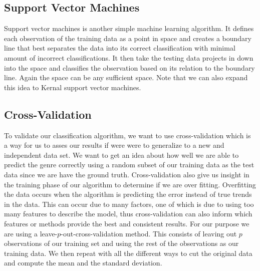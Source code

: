 \documentclass[12pt]{article}
\begin{document}
\subsection{Support Vector Machines} 
Support vector machines is another simple machine learning algorithm. It defines each observation of the training data as a point in space and creates a boundary line that best separates the data into its correct classification with minimal amount of incorrect classifications. It then take the testing data projects in down into the space and classifies the observation based on its relation to the boundary line. Again the space can be any sufficient space. Note that we can also expand this idea to Kernal support vector machines. 

\subsection{Cross-Validation}


To validate our classification algorithm, we want to use cross-validation which is a way for us to asses our results if were were to generalize to a new and independent data set. We want to get an idea about how well we are able to predict the genre correctly using a random subset of our training data as the test data since we are have the ground truth. Cross-validation also give us insight in the training phase of our algorithm to determine if we are over fitting. Overfitting the data occurs when the algorithm is predicting the error instead of true trends in the data. This can occur due to many factors, one of which is due to using too many features to describe the model, thus cross-validation can also inform which features or methods provide the best and consistent results. For our purpose we are using a leave-$p$-out-cross-validation method. This consists of leaving out $p$ observations of our training set and using the rest of the observations as our training data. We then repeat with all the different ways to cut the original data and compute the mean and the standard deviation. 

\end{document}
